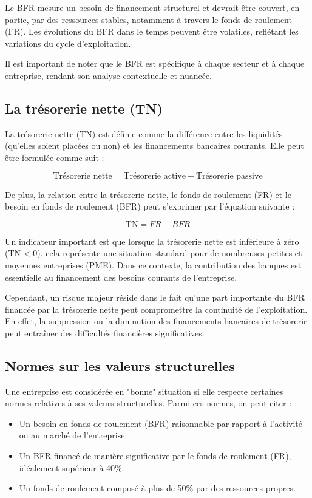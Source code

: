 \documentclass[a4paper, 12pt]{report}
\begin{document}
Le BFR mesure un besoin de financement structurel et devrait être couvert, en partie, par des ressources stables, notamment à travers le fonds de roulement (FR). Les évolutions du BFR dans le temps peuvent être volatiles, reflétant les variations du cycle d'exploitation. 

Il est important de noter que le BFR est spécifique à chaque secteur et à chaque entreprise, rendant son analyse contextuelle et nuancée.

\subsection{La trésorerie nette (TN)}

La trésorerie nette (TN) est définie comme la différence entre les liquidités (qu'elles soient placées ou non) et les financements bancaires courants. Elle peut être formulée comme suit :

\[
\text{Trésorerie nette} = \text{Trésorerie active} - \text{Trésorerie passive}
\]

De plus, la relation entre la trésorerie nette, le fonds de roulement (FR) et le besoin en fonds de roulement (BFR) peut s'exprimer par l'équation suivante :

\[
\text{TN} = FR - BFR
\]

Un indicateur important est que lorsque la trésorerie nette est inférieure à zéro (TN < 0), cela représente une situation standard pour de nombreuses petites et moyennes entreprises (PME). Dans ce contexte, la contribution des banques est essentielle au financement des besoins courants de l'entreprise. 

Cependant, un risque majeur réside dans le fait qu'une part importante du BFR financée par la trésorerie nette peut compromettre la continuité de l'exploitation. En effet, la suppression ou la diminution des financements bancaires de trésorerie peut entraîner des difficultés financières significatives.

\subsection{Normes sur les valeurs structurelles}

Une entreprise est considérée en "bonne" situation si elle respecte certaines normes relatives à ses valeurs structurelles. Parmi ces normes, on peut citer :

\begin{itemize}
	\item Un besoin en fonds de roulement (BFR) raisonnable par rapport à l'activité ou au marché de l'entreprise.
	\item Un BFR financé de manière significative par le fonds de roulement (FR), idéalement supérieur à 40\%.
	\item Un fonds de roulement composé à plus de 50\% par des ressources propres.
\end{itemize}
\end{document}
